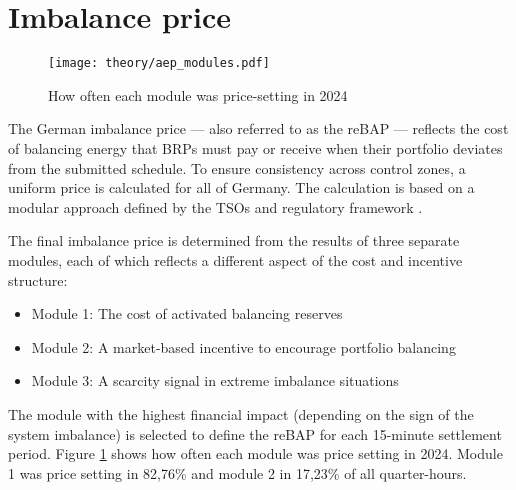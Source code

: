 \documentclass[class=scrbook, crop=false]{standalone}
\begin{document}




\section{Imbalance price}
\label{Section::Imbalance_Price}

 \begin{figure}[b]
            \centering
            \texttt{[image: theory/aep\_modules.pdf]}
             \caption[How often each module was price-setting in 2024?]{How often each module was price-setting in 2024 \cite{NetztransparenzAEPModul}}
            \label{fig::aep_modules}
 \end{figure}
The German imbalance price — also referred to as the \gls{reBAP} — reflects the cost of balancing energy that \gls{BRP}s must pay or receive when their portfolio deviates from the submitted schedule.
To ensure consistency across control zones, a uniform price is calculated for all of Germany. The calculation is based on a modular approach defined by the \gls{TSO}s and regulatory framework \cite{NetztransparenzReBAPDefinition}.

The final imbalance price is determined from the results of three separate modules, each of which reflects a different aspect of the cost and incentive structure:
\begin{itemize}
\item Module 1: The cost of activated balancing reserves
\item Module 2: A market-based incentive to encourage portfolio balancing
\item Module 3: A scarcity signal in extreme imbalance situations
\end{itemize}
The module with the highest financial impact (depending on the sign of the system imbalance) is selected to define the \gls{reBAP} for each 15-minute settlement period. Figure \ref{fig::aep_modules} shows how often each module was price setting in 2024. Module 1 was price setting in 82,76\% and module 2 in 17,23\% of all quarter-hours\cite{NetztransparenzAEPModul}.
\end{document}
